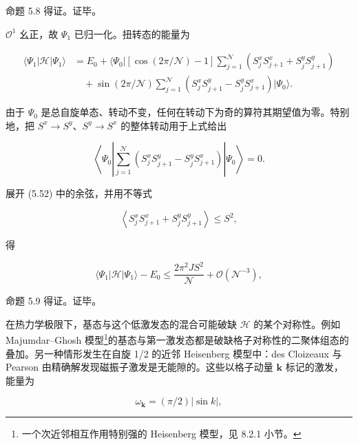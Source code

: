 命题 5.8 得证。证毕。

$\mathcal{O}^1$ 幺正，故 $\Psi_{1}$ 已归一化。扭转态的能量为

\begin{align*}
\langle \Psi_ {1} | \mathcal {H} | \Psi_ {1} \rangle & = E _ {0} + \Big\langle \Psi_ {0} \Big| \left[ \cos ( 2 \pi / \mathcal {N} ) - 1 \right] \sum_ {j = 1} ^ {\mathcal {N}} \left( S _ {j} ^ {x} S _ {j + 1} ^ {x} + S _ {j} ^ {y} S _ {j + 1} ^ {y} \right)\\
& \quad + \sin ( 2 \pi / \mathcal {N} ) \sum_ {j = 1} ^ {\mathcal {N}} \left( S _ {j} ^ {x} S _ {j + 1} ^ {y} - S _ {j} ^ {y} S _ {j + 1} ^ {x} \right) \Big| \Psi_ {0} \Big\rangle .
\tag{5.52}
\end{align*}

由于 $\Psi_{0}$ 是总自旋单态、转动不变，任何在转动下为奇的算符其期望值为零。特别地，把 $S^{x} \rightarrow S^{y}$、$S^{y} \rightarrow S^{x}$ 的整体转动用于上式给出

\begin{equation*}
\left\langle \Psi_ {0} \left| \sum_ {j = 1} ^ {\mathcal {N}} \left( S _ {j} ^ {x} S _ {j + 1} ^ {y} - S _ {j} ^ {y} S _ {j + 1} ^ {x} \right) \right| \Psi_ {0} \right\rangle = 0.
\tag{5.53}
\end{equation*}

展开 (5.52) 中的余弦，并用不等式

\begin{equation*}
\left\langle S _ {j} ^ {x} S _ {j + 1} ^ {x} + S _ {j} ^ {y} S _ {j + 1} ^ {y} \right\rangle \leq S ^ {2} ,
\tag{5.54}
\end{equation*}

得

\begin{equation*}
\langle \Psi_ {1} | \mathcal {H} | \Psi_ {1} \rangle - E _ {0} \leq \frac {2 \pi^ {2} J S ^ {2}}{\mathcal {N}} + \mathcal {O} ( \mathcal {N} ^ {- 3} ) ,
\tag{5.55}
\end{equation*}

命题 5.9 得证。证毕。

在热力学极限下，基态与这个低激发态的混合可能破缺 $\mathcal{H}$ 的某个对称性。例如 Majumdar--Ghosh 模型\footnote{一个次近邻相互作用特别强的 Heisenberg 模型，见 8.2.1 小节。}的基态与第一激发态都是破缺格子对称性的二聚体组态的叠加。另一种情形发生在自旋 1/2 的近邻 Heisenberg 模型中：des Cloizeaux 与 Pearson 由精确解发现磁振子激发是无能隙的。这些以格子动量 $\mathbf{k}$ 标记的激发，能量为

\begin{equation*}
\omega_ {\mathbf {k}} = ( \pi / 2 ) \left| \sin k \right| ,
\tag{5.56}
\end{equation*}

